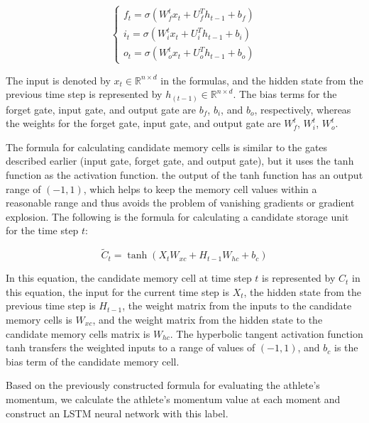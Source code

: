 \documentclass[12pt]{article}  %
\begin{document}
\begin{equation}
	\begin{cases}
		f_t = \sigma(W_f^tx_t + U_f^Th_{t-1}+b_f)\\[3pt]
		i_t = \sigma(W_i^tx_t + U_i^Th_{t-1}+b_i)\\[3pt]
		o_t = \sigma(W_o^tx_t + U_o^Th_{t-1}+b_o)
	\end{cases}
\end{equation}

The input is denoted by \(x_t \in \mathbb{R}^{n \times d}\) in the formulas, and the hidden state from the previous time step is represented by \(h_{(t-1)} \in \mathbb{R}^{n \times d}\). The bias terms for the forget gate, input gate, and output gate are \(b_f\), \(b_i\), and \(b_o\), respectively, whereas the weights for the forget gate, input gate, and output gate are \(W_f^t\), \(W_i^t\), \(W_o^t\).

The formula for calculating candidate memory cells is similar to the gates described earlier (input gate, forget gate, and output gate), but it uses the tanh function as the activation function. the output of the tanh function has an output range of \((-1, 1)\), which helps to keep the memory cell values within a reasonable range and thus avoids the problem of vanishing gradients or gradient explosion. The following is the formula for calculating a candidate storage unit for the time step \(t\):

\begin{equation}
	\tilde{C}_t = \tanh(X_t W_{xc} + H_{t-1} W_{hc} + b_c)
\end{equation}

In this equation, the candidate memory cell at time step \(t\) is represented by \(C_t\) in this equation, the input for the current time step is \(X_t\), the hidden state from the previous time step is \(H_{t-1}\), the weight matrix from the inputs to the candidate memory cells is \(W_{xc}\), and the weight matrix from the hidden state to the candidate memory cells matrix is \(W_{hc}\). The hyperbolic tangent activation function tanh transfers the weighted inputs to a range of values of \((-1, 1)\), and \(b_c\) is the bias term of the candidate memory cell.

Based on the previously constructed formula for evaluating the athlete's momentum, we calculate the athlete's momentum value at each moment and construct an LSTM neural network with this label.
\end{document}
